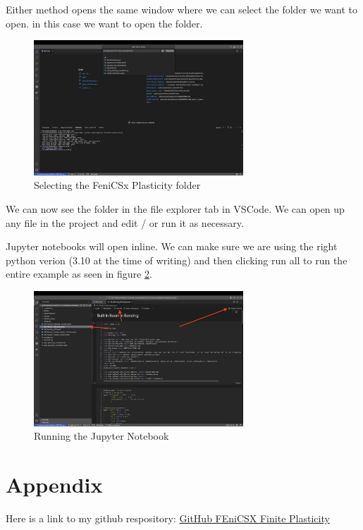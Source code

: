 \documentclass[final]{article}
\numberwithin{equation}{section}
\theoremstyle{remarkStyle}
\begin{document}
Either method opens the same window where we can select the folder we want to open.
in this case we want to open the  folder.
\begin{figure}[H]
  \centering
  \includegraphics[width=0.7\textwidth]{Open-Folder-accept.png}
  \caption{Selecting the FeniCSx Plasticity folder }%
  \label{fig:vsDocker-Open-Folder-Accept}%
\end{figure}

We can now see the folder in the file explorer tab in VSCode. We can open up any file in the project and edit / or run it as necessary.

Jupyter notebooks will open inline. We can make sure we are using the right python verion (3.10 at the time of writing) and then clicking run all to run the entire example as seen in figure \ref{fig:Project_Open}.
\begin{figure}[H]
  \centering
  \includegraphics[width=0.7\textwidth]{VSCode-ProjectOpen.png}
  \caption{Running the Jupyter Notebook }%
  \label{fig:Project_Open}%
\end{figure}


\section{Appendix}
Here is a link to my github respository:
\href{https://github.com/jorgenin/2.077-Fenicsx-Plasticity}{GitHub FEniCSX Finite Plasticity}
\end{document}
